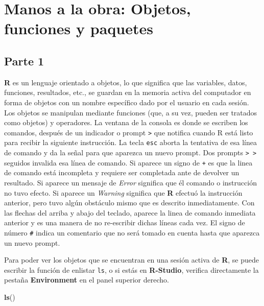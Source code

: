 \documentclass[
]{article}
\newenvironment{Shaded}{\begin{snugshade}}{\end{snugshade}}
\newcommand{\KeywordTok}[1]{\textcolor[rgb]{0.13,0.29,0.53}{\textbf{#1}}}
\newcommand{\NormalTok}[1]{#1}
\begin{document}
\hypertarget{manos-a-la-obra-objetos-funciones-y-paquetes}{%
\section{Manos a la obra: Objetos, funciones y
paquetes}\label{manos-a-la-obra-objetos-funciones-y-paquetes}}

\hypertarget{parte-1}{%
\subsection{Parte 1}\label{parte-1}}

\textbf{R} es un lenguaje orientado a objetos, lo que significa que las
variables, datos, funciones, resultados, etc., se guardan en la memoria
activa del computador en forma de objetos con un nombre específico dado
por el usuario en cada sesión. Los objetos se manipulan mediante
funciones (que, a su vez, pueden ser tratados como objetos) y
operadores. La ventana de la consola es donde se escriben los comandos,
después de un indicador o prompt \texttt{\textgreater{}} que notifica
cuando R está listo para recibir la siguiente instrucción. La tecla
\texttt{esc} aborta la tentativa de esa línea de comando y da la señal
para que aparezca un nuevo prompt. Dos prompts
\texttt{\textgreater{}\ \textgreater{}} seguidos invalida esa línea de
comando. Si aparece un signo de \texttt{+} es que la linea de comando
está incompleta y requiere ser completada ante de devolver un resultado.
Si aparece un mensaje de \emph{Error} significa que él comando o
instrucción no tuvo efecto. Si aparece un \emph{Warning} significa que
\textbf{R} efectuó la instrucción anterior, pero tuvo algún obstáculo
mismo que es descrito inmediatamente. Con las flechas del arriba y abajo
del teclado, aparece la linea de comando inmediata anterior y es una
manera de no re-escribir dichas líneas cada vez. El signo de número
\texttt{\#} indica un comentario que no será tomado en cuenta hasta que
aparezca un nuevo prompt.

Para poder ver los objetos que se encuentran en una sesión activa de
\textbf{R}, se puede escribir la función de enlistar \texttt{ls}, o si
estás en \textbf{R-Studio}, verifica directamente la pestaña
\textbf{Environment} en el panel superior derecho.

\begin{Shaded}
\begin{Highlighting}[]
\KeywordTok{ls}\NormalTok{()}
\end{Highlighting}
\end{Shaded}
\end{document}
